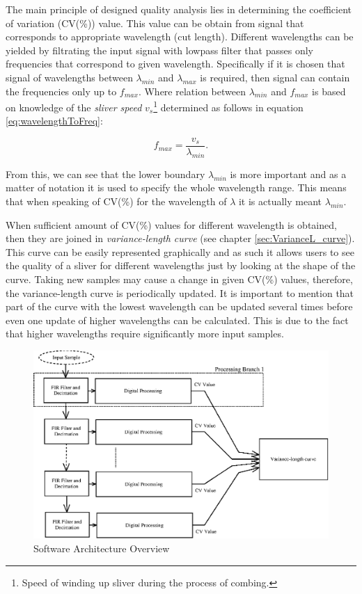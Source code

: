 \documentclass[twoside]{ctuthesis}
\theoremstyle{plain}
\theoremstyle{definition}
\theoremstyle{note}
\begin{document}
The main principle of designed quality analysis lies in determining the coefficient of variation (CV(\%)) value. This value can be obtain from signal that corresponds to appropriate wavelength (cut length). Different wavelengths can be yielded by filtrating the input signal with lowpass filter that passes only frequencies that correspond to given wavelength. Specifically if it is chosen that signal of wavelengths between $\lambda_{min}$ and $\lambda_{max}$ is required, then signal can contain the frequencies only up to $f_{max}$. Where relation between $\lambda_{min}$ and $f_{max}$ is based on knowledge of the \textit{sliver speed} $v_{s}$\footnote{Speed of winding up sliver during the process of combing.} determined as follows in equation \ref{eq:wavelengthToFreq}:

\begin{equation} \label{eq:wavelengthToFreq}
	f_{max} = \frac{v_{s}}{\lambda_{min}}.
\end{equation}

From this, we can see that the lower boundary $\lambda_{min}$ is more important and as a matter of notation it is used to specify the whole wavelength range. This means that when speaking of CV(\%) for the wavelength of $\lambda$ it is actually meant $\lambda_{min}$.

When sufficient amount of CV(\%) values for different wavelength is obtained, then they are joined in \textit{variance-length curve} (see chapter \ref{sec:VarianceL_curve}). This curve can be easily represented graphically and as such it allows users to see the quality of a sliver for different wavelengths just by looking at the shape of the curve. Taking new samples may cause a change in given CV(\%) values, therefore, the variance-length curve is periodically updated. It is important to mention that part of the curve with the lowest wavelength can be updated several times before even one update of higher wavelengths can be calculated. This is due to the fact that higher wavelengths require significantly more input samples.

\begin{figure}[h]
	\centering
	\includegraphics[width=1.0\textwidth]{system_overview.eps}
	\caption{Software Architecture Overview}
	\label{fig:software_overview}
\end{figure}
\end{document}
